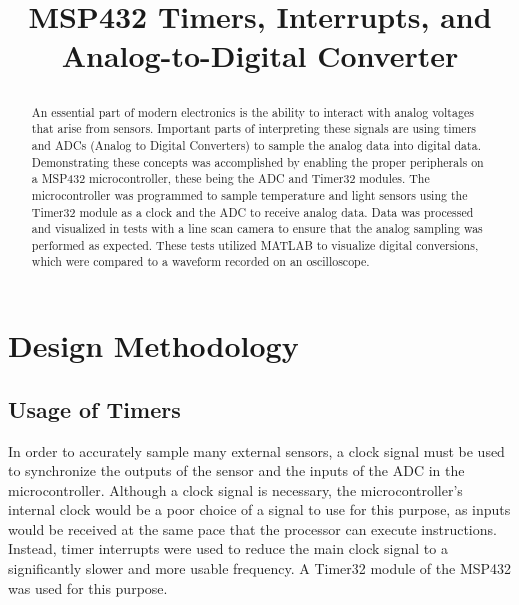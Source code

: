 \documentclass[conference]{IEEEtran}
\begin{document}
\title{MSP432 Timers, Interrupts, and Analog-to-Digital Converter\\

\author{
\and
{}
}
}

\maketitle

\begin{abstract}
An essential part of modern electronics is the ability to interact with
analog voltages that arise from sensors. Important parts of interpreting
these signals are using timers and ADCs (Analog to Digital Converters) to
sample the analog data into digital data. Demonstrating these concepts was
accomplished by enabling the proper peripherals on a MSP432 microcontroller,
these being the ADC and Timer32 modules. The microcontroller was programmed
to sample temperature and light sensors using the Timer32 module
as a clock and the ADC to receive analog data. Data was processed and
visualized in tests with a line scan camera to ensure that the analog sampling
was performed as expected. These tests utilized MATLAB to visualize digital
conversions, which were compared to a waveform recorded on an oscilloscope.
\end{abstract}

\section{Design Methodology}

\subsection{Usage of Timers}
In order to accurately sample many external sensors, a clock signal must be 
used to synchronize the outputs of the sensor and the inputs of the ADC in
the microcontroller. Although a clock signal is necessary, the
microcontroller's internal clock would be a poor choice of a signal to use
for this purpose, as inputs would be received at the same pace that the
processor can execute instructions. Instead, timer interrupts were used to
reduce the main clock signal to a significantly slower and more usable
frequency. A Timer32 module of the MSP432 was used for this purpose.
\end{document}
